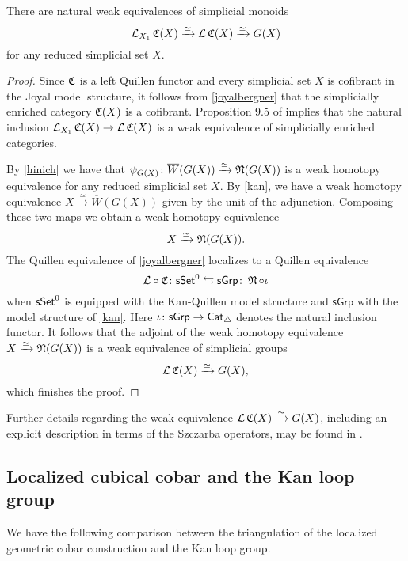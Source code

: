 \begin{proposition} \label{CandG}
	There are natural weak equivalences of simplicial monoids
	\begin{equation*}
	\mathcal{L}_{X_1} \operatorname{\mathfrak{C}}(X) \xrightarrow{\simeq} \mathcal{L}\operatorname{\mathfrak{C}}(X) \xrightarrow{\simeq} G(X)
	\end{equation*}
	for any reduced simplicial set $X$.
\end{proposition}

\begin{proof}
	Since $\operatorname{\mathfrak{C}}$ is a left Quillen functor and every simplicial set $X$ is cofibrant in the Joyal model structure, it follows from \cref{joyalbergner} that the simplicially enriched category $\operatorname{\mathfrak{C}}(X)$ is a cofibrant.
	Proposition 9.5 of \cite{dwyer1980simplicial} implies that the natural inclusion $\mathcal{L}_{X_1} \operatorname{\mathfrak{C}}(X) \to \mathcal{L}\operatorname{\mathfrak{C}}(X)$ is a weak equivalence of simplicially enriched categories.
	
	By \cref{hinich} we have that $\psi_{G(X)} \colon \overline{W}(G(X)) \xrightarrow{\simeq} \operatorname{\mathfrak{N}}(G(X))$ is a weak homotopy equivalence for any reduced simplicial set $X$.
	By \cref{kan}, we have a weak homotopy equivalence $X \xrightarrow{\simeq} \overline{W}(G(X))$ given by the unit of the adjunction.
	Composing these two maps we obtain a weak homotopy equivalence
	$$X \xrightarrow{\simeq} \operatorname{\mathfrak{N}}(G(X)).$$
	The Quillen equivalence of \cref{joyalbergner} localizes to a Quillen equivalence
	$$\mathcal{L} \circ \operatorname{\mathfrak{C}} \colon \mathsf{sSet}^0 \leftrightarrows \mathsf{sGrp} \colon \operatorname{\mathfrak{N}} \circ \iota$$
	when $\mathsf{sSet}^0$ is equipped with the Kan-Quillen model structure and $\mathsf{sGrp}$ with the model structure of \cref{kan}.
	Here $\iota \colon \mathsf{sGrp} \to \mathsf{Cat}_{\triangle}$ denotes the natural inclusion functor.
	It follows that the adjoint of the weak homotopy equivalence $X \xrightarrow{\simeq} \operatorname{\mathfrak{N}}(G(X))$ is a weak equivalence of simplicial groups
	$$\mathcal{L}\operatorname{\mathfrak{C}}(X) \xrightarrow{\simeq} G(X),$$
	which finishes the proof.
\end{proof}

Further details regarding the weak equivalence $\mathcal{L} \operatorname{\mathfrak{C}}(X) \xrightarrow{\simeq} G(X)$, including an explicit description in terms of the Szczarba operators, may be found in \cite{minichello2021path}.

\subsection{Localized cubical cobar and the Kan loop group}

We have the following comparison between the triangulation of the localized geometric cobar construction and the Kan loop group.

